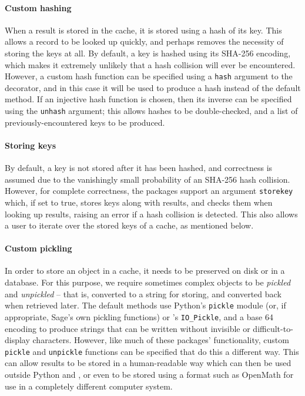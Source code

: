 \documentclass{deliverablereport}
\begin{document}
\paragraph{Custom hashing}
When a result is stored in the cache, it is stored using a hash of its key.
This allows a record to be looked up quickly, and perhaps removes the necessity
of storing the keys at all.  By default, a key is hashed using its SHA-256
encoding, which makes it extremely unlikely that a hash collision will ever be
encountered.  However, a custom hash function can be specified using a
\texttt{hash} argument to the decorator, and in this case it will be used to
produce a hash instead of the default method.  If an injective hash function is
chosen, then its inverse can be specified using the \texttt{unhash} argument;
this allows hashes to be double-checked, and a list of previously-encountered
keys to be produced.

\paragraph{Storing keys}
By default, a key is not stored after it has been hashed, and correctness is
assumed due to the vanishingly small probability of an SHA-256 hash collision.
However, for complete correctness, the packages support an argument
\texttt{storekey} which, if set to true, stores keys along with results, and
checks them when looking up results, raising an error if a hash collision is
detected.  This also allows a user to iterate over the stored keys of a cache,
as mentioned below.

\paragraph{Custom pickling}
In order to store an object in a cache, it needs to be preserved on disk or in a
database.  For this purpose, we require sometimes complex objects to be
\textit{pickled} and \textit{unpickled} -- that is, converted to a string for
storing, and converted back when retrieved later.  The default methods use
Python's \texttt{pickle} module (or, if appropriate, Sage's own pickling
functions) or \GAP's \texttt{IO\_Pickle}, and a base 64 encoding to produce strings that
can be written without invisible or difficult-to-display characters.  However,
like much of these packages' functionality, custom \texttt{pickle} and
\texttt{unpickle} functions can be specified that do this a different way.  This
can allow results to be stored in a human-readable way which can then be used
outside Python and \GAP, or even to be stored using a format such as OpenMath for use in
a completely different computer system.
\end{document}
